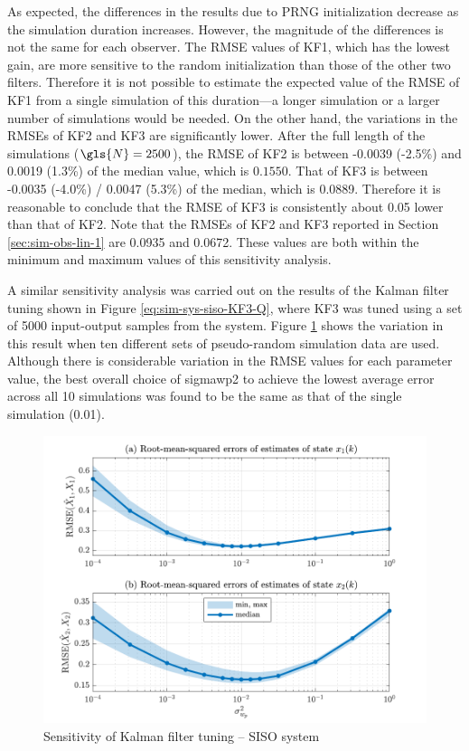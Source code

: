 As expected, the differences in the results due to \gls{PRNG} initialization decrease as the simulation duration increases. However, the magnitude of the differences is not the same for each observer. The \gls{RMSE} values of KF1, which has the lowest gain, are more sensitive to the random initialization than those of the other two filters. Therefore it is not possible to estimate the expected value of the \gls{RMSE} of KF1 from a single simulation of this duration---a longer simulation or a larger number of simulations would be needed. On the other hand, the variations in the \gls{RMSE}s of KF2 and KF3 are significantly lower. After the full length of the simulations ($\gls{N}=2500$), the \gls{RMSE} of KF2 is between -0.0039 (-2.5\%) and 0.0019 (1.3\%) of the median value, which is $0.1550$.  That of KF3 is between -0.0035 (-4.0\%) / 0.0047 (5.3\%) of the median, which is 0.0889.  Therefore it is reasonable to conclude that the \gls{RMSE} of KF3 is consistently about 0.05 lower than that of KF2. Note that the \gls{RMSE}s of KF2 and KF3 reported in Section \ref{sec:sim-obs-lin-1} are 0.0935 and 0.0672. These values are both within the minimum and maximum values of this sensitivity analysis.

A similar sensitivity analysis was carried out on the results of the Kalman filter tuning shown in Figure \ref{eq:sim-sys-siso-KF3-Q}, where KF3 was tuned using a set of 5000 input-output samples from the system. Figure \ref{fig:sim-sys-siso-KF3-sensitivity} shows the variation in this result when ten different sets of pseudo-random simulation data are used.  Although there is considerable variation in the \gls{RMSE} values for each parameter value, the best overall choice of \gls{sigmawp2} to achieve the lowest average error across all 10 simulations was found to be the same as that of the single simulation (0.01).
\begin{figure}[htp]
	\centering
	\includegraphics[width=14cm]{images/rod_obs_sim1_3KF_Q_statplot.pdf}
	\caption{Sensitivity of Kalman filter tuning – SISO system}
	\label{fig:sim-sys-siso-KF3-sensitivity}
\end{figure}

